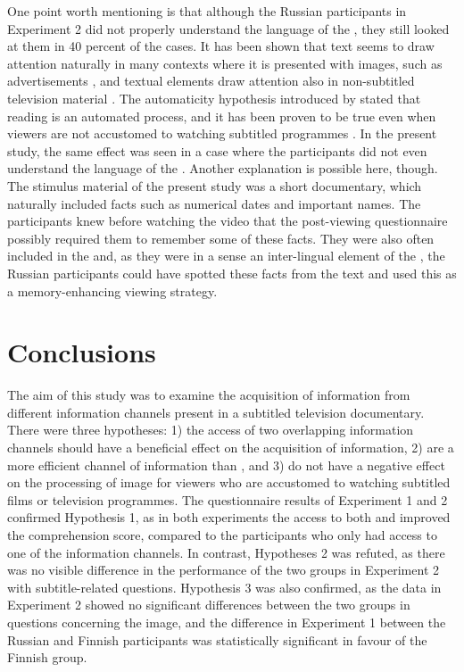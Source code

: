 \documentclass[output=paper]{langsci/langscibook}
\begin{document}
One point worth mentioning is that although the Russian participants in Experiment 2 did not properly understand the language of the , they still looked at them in 40 percent of the cases. It has been shown that text seems to draw attention naturally in many contexts where it is presented with images, such as advertisements \citep{rayner2001,rayner2008}, and textual elements draw attention also in non-subtitled television material \citep{tosi1997}. The automaticity hypothesis introduced by \citet{dydewalle1987} stated that reading  is an automated process, and it has been proven to be true even when viewers are not accustomed to watching subtitled programmes \citep{dydewalle1991}. In the present study, the same effect was seen in a case where the participants did not even understand the language of the . Another explanation is possible here, though. The stimulus material of the present study was a short documentary, which naturally included facts such as numerical dates and important names. The participants knew before watching the video that the post-viewing questionnaire possibly required them to remember some of these facts. They were also often included in the  and, as they were in a sense an inter-lingual element of the , the Russian participants could have spotted these facts from the text and used this as a memory-enhancing viewing strategy. 

\section{Conclusions}

The aim of this study was to examine the acquisition of information from different information channels present in a subtitled television documentary. There were three hypotheses: 1) the access of two overlapping information channels should have a beneficial effect on the acquisition of information, 2)  are a more efficient channel of information than , and 3)  do not have a negative effect on the processing of image for viewers who are accustomed to watching subtitled films or television programmes. The questionnaire results of Experiment 1 and 2 confirmed Hypothesis 1, as in both experiments the access to both  and  improved the comprehension score, compared to the participants who only had access to one of the information channels. In contrast, Hypotheses 2 was refuted, as there was no visible difference in the performance of the two groups in Experiment 2 with subtitle-related questions. Hypothesis 3 was also confirmed, as the data in Experiment 2 showed no significant differences between the two groups in questions concerning the image, and the difference in Experiment 1 between the Russian and Finnish participants was statistically significant in favour of the Finnish group. 
\end{document}
